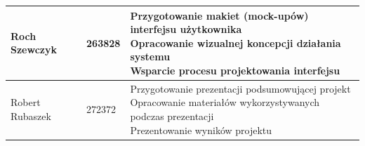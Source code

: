 \begin{longtable}{|p{3cm}|p{1.8cm}|p{10.2cm}|}
Roch Szewczyk &
263828 &
\parbox[t]{10cm}{
Przygotowanie makiet (mock-upów) interfejsu użytkownika \\
Opracowanie wizualnej koncepcji działania systemu \\
Wsparcie procesu projektowania interfejsu
}
\\
\hline


Robert Rubaszek &
272372 &
\parbox[t]{10cm}{
Przygotowanie prezentacji podsumowującej projekt \\
Opracowanie materiałów wykorzystywanych podczas prezentacji \\
Prezentowanie wyników projektu
}
\\
\hline

\end{longtable}